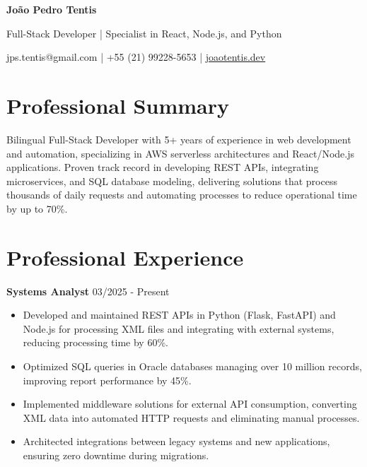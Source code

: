 \documentclass[a4paper,11pt]{article}
\begin{document}
\begin{center}
{\LARGE\bfseries João Pedro Tentis}
\end{center}
\begin{center}
{\color{muted}\large Full-Stack Developer | Specialist in React, Node.js, and Python}
\end{center}
\begin{center}
{\color{muted}\small jps.tentis@gmail.com \enspace | \enspace +55 (21) 99228-5653} \enspace | \enspace \href{https://joaotentis.dev}{joaotentis.dev}
\end{center}
\vspace{0.2em}
\section*{Professional Summary}
Bilingual Full-Stack Developer with 5+ years of experience in web development and automation, specializing in AWS serverless architectures and React/Node.js applications. Proven track record in developing REST APIs, integrating microservices, and SQL database modeling, delivering solutions that process thousands of daily requests and automating processes to reduce operational time by up to 70\%.

\section*{Professional Experience}
\vspace{0.3em}
\noindent\textbf{Systems Analyst} \hfill {\color{light}\small 03/2025 - Present}

\begin{itemize}[leftmargin=1.5em, itemsep=1pt, parsep=0pt, topsep=2pt]
  \item Developed and maintained REST APIs in Python (Flask, FastAPI) and Node.js for processing XML files and integrating with external systems, reducing processing time by 60\%.
  \item Optimized SQL queries in Oracle databases managing over 10 million records, improving report performance by 45\%.
  \item Implemented middleware solutions for external API consumption, converting XML data into automated HTTP requests and eliminating manual processes.
  \item Architected integrations between legacy systems and new applications, ensuring zero downtime during migrations.
\end{itemize}
\end{document}
